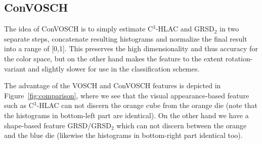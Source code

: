 \documentclass[a4paper, 10 pt, conference]{sty/ieeeconf}
\begin{document}
\subsection{ConVOSCH}
The idea of ConVOSCH is to simply estimate C$^3$-HLAC and GRSD$_2$ in two separate steps, 
concatenate resulting histograms and normalize the final result into a range of [0,1]. This preserves the 
high dimensionality and thus accuracy for the color space, but on the other hand 
makes the feature to the extent rotation-variant and slightly slower for use 
in the classification schemes.
\vspace{2ex}

The advantage of the VOSCH and ConVOSCH features is depicted in Figure~\ref{fig:comparison},
where we see that the visual appearance-based feature such as C$^3$-HLAC can not
discern the orange cube from the orange die (note that the histograms in bottom-left part are identical). 
On the other hand we have a shape-based feature GRSD/GRSD$_2$
which can not discern between the orange and the blue die (likewise the
histograms in bottom-right part identical too).
\end{document}

